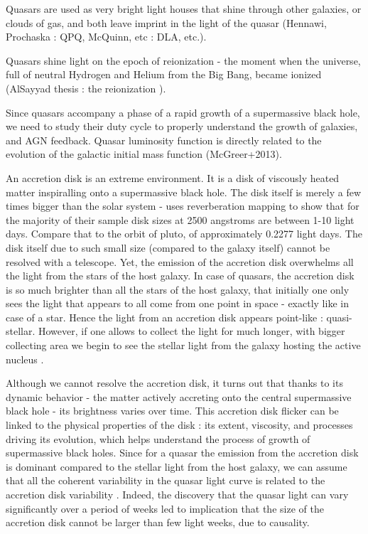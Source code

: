 \documentclass[modern]{aastex62}
\begin{document}
Quasars are used as very bright light houses that shine through other galaxies, or clouds of gas, and both leave imprint in the light of the quasar  (Hennawi, Prochaska : QPQ,  McQuinn, etc : DLA, etc.).

Quasars shine light on the epoch of reionization - the moment when the universe, full of neutral Hydrogen and Helium from the Big Bang, became ionized (AlSayyad thesis : the reionization ). 


Since quasars accompany a phase of a rapid growth of a supermassive black hole, we need to study their duty cycle to properly understand the growth of galaxies, and AGN feedback. Quasar luminosity function is directly related to the evolution of the galactic initial mass function (McGreer+2013). 

An accretion disk is an extreme environment. It is a disk of viscously heated matter inspiralling onto a supermassive black hole. The disk itself is merely a few times bigger than  the solar system -  \citep{mudd2017} uses reverberation mapping to show that for the majority of their sample disk sizes at 2500 angstroms are between 1-10 light days. Compare that to the orbit of pluto, of approximately 0.2277 light days. The disk itself due to such small size (compared to the galaxy itself) cannot be resolved with a telescope.  Yet, the emission of the accretion disk overwhelms all the light from the stars of the host galaxy.   In case of quasars, the accretion disk is so much brighter than all the stars of the host galaxy, that initially one only sees the light that appears to all come from one point in space - exactly like in case of a star. Hence the light from an accretion disk appears point-like : quasi-stellar. However,  if one allows to collect the light for much longer, with bigger collecting area  we begin to see the stellar light from the galaxy hosting the active nucleus \citep{hutchings2002,kotilainen2013, falomo2014, liuzzo2016, bayliss2017}. 

Although we cannot resolve the accretion disk, it turns out that thanks to its dynamic behavior  - the matter actively accreting onto the central supermassive black hole - its brightness varies over time. This accretion disk flicker can be linked to the physical properties of the disk : its extent, viscosity, and processes driving its evolution, which helps understand the process of growth of supermassive black holes.  Since for a quasar the emission from the accretion disk is dominant compared to the stellar light from the host galaxy, we can assume that all the coherent variability  in the quasar light curve is related to the accretion disk variability . Indeed, the discovery that the quasar light can vary significantly over a period of weeks led to implication that the size of the accretion disk cannot be larger than few light weeks, due to causality. 
\end{document}

